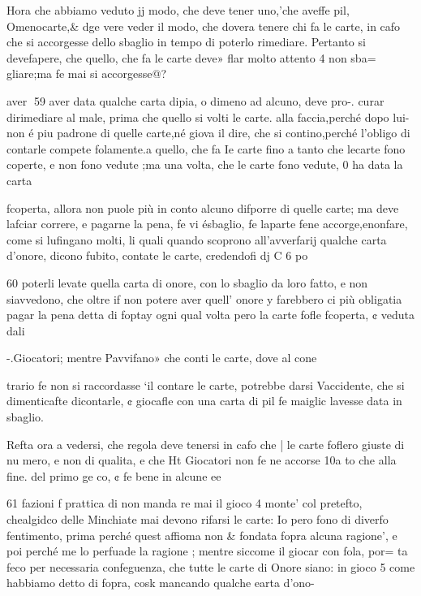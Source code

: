 \documentclass[12pt,a6paper]{article}
\begin{document}
Hora che abbiamo veduto jj
modo, che deve tener uno,'che
aveffe pil, Omenocarte,& dge
vere veder il modo, che dovera tenere chi fa le carte, in cafo
che si accorgesse dello sbaglio
in tempo di poterlo rimediare.
Pertanto si devefapere, che
quello, che fa le carte deve»
flar molto attento 4 non sba=
gliare;ma fe mai si accorgesse@?

aver
59
aver data qualche carta dipia,
o dimeno ad alcuno, deve pro-.
curar dirimediare al male, prima che quello si volti le carte.
alla faccia,perché dopo lui-non
é piu padrone di quelle carte,né
giova il dire, che si contino,perché l’obligo di contarle compete folamente.a quello, che fa Ie
carte fino a tanto che lecarte
fono coperte, e non fono vedute ;ma una volta, che le carte
fono vedute, 0 ha data la carta

fcoperta, allora non puole più 
in conto alcuno difporre di
quelle carte; ma deve lafciar
correre, e pagarne la pena, fe vi
ésbaglio, fe laparte fene accorge,enonfare, come si lufingano molti, li quali quando
scoprono all’avverfarij qualche
carta d’onore, dicono fubito,
contate le carte, credendofi dj
C 6 po 

 

 

  

60
poterli levate quella carta di
onore, con lo sbaglio da loro
fatto, e non siavvedono, che
oltre if non potere aver quell’
onore y farebbero ci più obligatia pagar la pena detta di foptay
ogni qual volta pero la carte
fofle fcoperta, ¢ veduta dali

-.Giocatori; mentre Pavvifano»
che conti le carte, dove al cone

trario fe non si raccordasse ‘il
contare le carte, potrebbe darsi
Vaccidente, che si dimenticafte
dicontarle, ¢ giocafle con una
carta di pil fe maiglic lavesse
data in sbaglio.

Refta ora a vedersi, che regola deve tenersi in cafo che |
le carte foflero giuste di nu
mero, e non di qualita, e che Ht
Giocatori non fe ne accorse 10a
to che alla fine. del primo ge
co, ¢ fe bene in alcune ee
 

61
fazioni f prattica di non manda
re mai il gioco 4 monte’ col pretefto, chealgidco delle Minchiate mai devono rifarsi le
carte: Io pero fono di diverfo
fentimento, prima perché quest
affioma non & fondata fopra alcuna ragione’, e poi perché me
lo perfuade la ragione ; mentre
siccome il giocar con fola, por=
ta feco per necessaria confeguenza, che tutte le carte di
Onore siano: in gioco 5 come
habbiamo detto di fopra, cosk
mancando qualche earta d’ono-~
\end{document}
